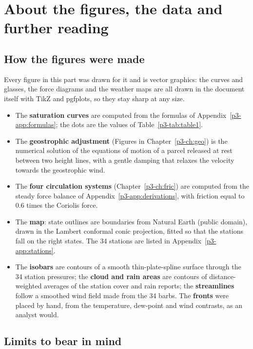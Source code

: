 \section{About the figures, the data and further reading}\label{p3-app:about}

\subsection{How the figures were made}

Every figure in this part was drawn for it and is vector graphics: the curves and glasses, the force diagrams and the weather maps are all drawn in the document itself with TikZ and pgfplots, so they stay sharp at any size.

\begin{itemize}
\item The \textbf{saturation curves} are computed from the formulas of Appendix~\ref{p3-app:formulas}; the dots are the values of Table~\ref{p3-tab:table1}.
\item The \textbf{geostrophic adjustment} (Figures in Chapter~\ref{p3-ch:geo}) is the numerical solution of the equations of motion of a parcel released at rest between two height lines, with a gentle damping that relaxes the velocity towards the geostrophic wind.
\item The \textbf{four circulation systems} (Chapter~\ref{p3-ch:fric}) are computed from the steady force balance of Appendix~\ref{p3-app:derivations}, with friction equal to 0.6 times the Coriolis force.
\item The \textbf{map}: state outlines are boundaries from Natural Earth (public domain), drawn in the Lambert conformal conic projection, fitted so that the stations fall on the right states. The 34 stations are listed in Appendix~\ref{p3-app:stations}.
\item The \textbf{isobars} are contours of a smooth thin-plate-spline surface through the 34 station pressures; the \textbf{cloud and rain areas} are contours of distance-weighted averages of the station cover and rain reports; the \textbf{streamlines} follow a smoothed wind field made from the 34 barbs. The \textbf{fronts} were placed by hand, from the temperature, dew-point and wind contrasts, as an analyst would.
\end{itemize}

\subsection{Limits to bear in mind}

